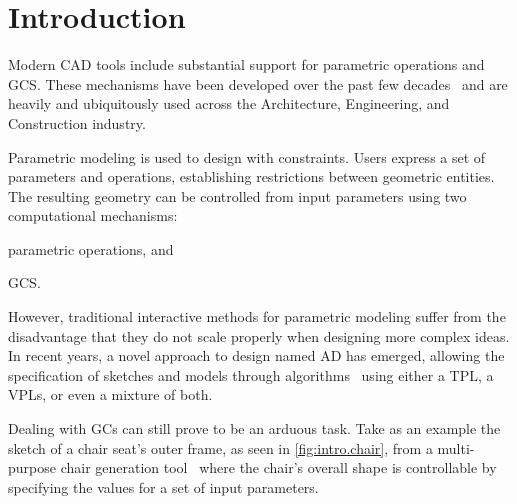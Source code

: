 \section{Introduction}%
\label{sec:intro}

Modern \ac{CAD} tools include substantial support for parametric operations and
\ac{GCS}.  These mechanisms have been developed over the past few
decades~\cite{Bettig:2011:GCSPC} and are heavily and ubiquitously used across
the Architecture, Engineering, and Construction industry.

Parametric modeling is used to design with constraints.  Users express a set of
parameters and operations, establishing restrictions between geometric entities.
The resulting geometry can be controlled from input parameters using two
computational mechanisms:
\begin{enumerate*}[label= (\arabic*)]
  \item parametric operations, and
  \item \ac{GCS}.
\end{enumerate*}

However, traditional interactive methods for parametric modeling suffer from the
disadvantage that they do not scale properly when designing more complex ideas.
In recent years, a novel approach to design named \ac{AD} has emerged, allowing
the specification of sketches and models through
algorithms~\cite{McCormack:2004:GDPDR} using either a \ac{TPL}, a \acp{VPL}, or
even a mixture of both.

Dealing with \acp{GC} can still prove to be an arduous task.  Take as an example
the sketch of a chair seat's outer frame, as seen in \cref{fig:intro.chair},
from a multi-purpose chair generation tool~\cite{Garcia:2012:ChairDNA} where the
chair's overall shape is controllable by specifying the values for a set of
input parameters.

